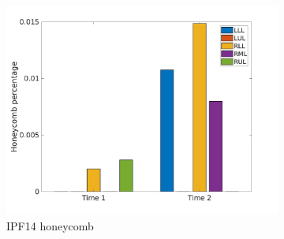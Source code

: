 \begin{figure}[H]
\begin{subfigure}{.46\linewidth}
  \includegraphics[width=\linewidth,trim={{.0\wd0} {.0\wd0} {.0\wd0} {.0\wd0}},clip]{Appendix/Image_AppexA/LobarDistribution/IPF14HoneycombLobarRegionDiseaseDistributionOverTime.jpg} %
  \caption{IPF14 honeycomb}
  \label{fig:IPF14LobarRegionDiseaseDistributionOverTime-c} 
\end{subfigure} 
\hspace{.3in}
\begin{subfigure}{.46\linewidth}%

\end{subfigure}
\end{figure}

